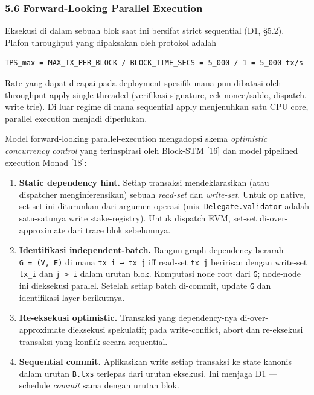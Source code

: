 \documentclass[11pt,a4paper]{article}
\providecommand{\tightlist}{\setlength{\itemsep}{0pt}\setlength{\parskip}{0pt}}
\begin{document}
\hypertarget{forward-looking-parallel-execution}{%
\subsubsection{5.6 Forward-Looking Parallel Execution}\label{forward-looking-parallel-execution}}

Eksekusi di dalam sebuah blok saat ini bersifat strict sequential (D1, §5.2). Plafon throughput yang dipaksakan oleh protokol adalah

\begin{verbatim}
TPS_max = MAX_TX_PER_BLOCK / BLOCK_TIME_SECS = 5_000 / 1 = 5_000 tx/s
\end{verbatim}

Rate yang dapat dicapai pada deployment spesifik mana pun dibatasi oleh throughput apply single-threaded (verifikasi signature, cek nonce/saldo, dispatch, write trie). Di luar regime di mana sequential apply menjenuhkan satu CPU core, parallel execution menjadi diperlukan.

Model forward-looking parallel-execution mengadopsi skema \emph{optimistic concurrency control} yang terinspirasi oleh Block-STM {[}16{]} dan model pipelined execution Monad {[}18{]}:

\begin{enumerate}
\def\labelenumi{\arabic{enumi}.}
\tightlist
\item
  \textbf{Static dependency hint.} Setiap transaksi mendeklarasikan (atau dispatcher menginferensikan) sebuah \emph{read-set} dan \emph{write-set}. Untuk op native, set-set ini diturunkan dari argumen operasi (mis. \texttt{Delegate.validator} adalah satu-satunya write stake-registry). Untuk dispatch EVM, set-set di-over-approximate dari trace blok sebelumnya.
\item
  \textbf{Identifikasi independent-batch.} Bangun graph dependency berarah \texttt{G\ =\ (V,\ E)} di mana \texttt{tx\_i\ →\ tx\_j} iff read-set \texttt{tx\_j} beririsan dengan write-set \texttt{tx\_i} dan \texttt{j\ \textgreater{}\ i} dalam urutan blok. Komputasi node root dari \texttt{G}; node-node ini dieksekusi paralel. Setelah setiap batch di-commit, update \texttt{G} dan identifikasi layer berikutnya.
\item
  \textbf{Re-eksekusi optimistic.} Transaksi yang dependency-nya di-over-approximate dieksekusi spekulatif; pada write-conflict, abort dan re-eksekusi transaksi yang konflik secara sequential.
\item
  \textbf{Sequential commit.} Aplikasikan write setiap transaksi ke state kanonis dalam urutan \texttt{B.txs} terlepas dari urutan eksekusi. Ini menjaga D1 --- schedule \emph{commit} sama dengan urutan blok.
\end{enumerate}
\end{document}
